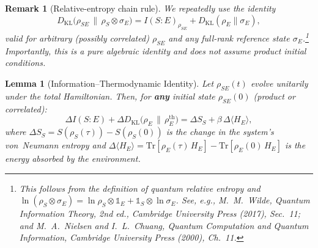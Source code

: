 \documentclass[12pt,a4paper,openany]{book}
\newtheorem{lemma}[theorem]{Lemma}
\newtheorem{remark}[theorem]{Remark}
\begin{document}
\begin{remark}[Relative-entropy chain rule]
\label{T-I-rem:chain_rule}
We repeatedly use the identity
\begin{equation}
\label{T-I-eq:chain_general}
D_{\mathrm{KL}}\!\bigl(\rho_{SE}\,\big\|\,
  \rho_S\otimes\sigma_E\bigr)
= I(S{:}E)_{\rho_{SE}}
  + D_{\mathrm{KL}}(\rho_E\|\sigma_E),
\end{equation}
valid for \emph{arbitrary} (possibly correlated)
$\rho_{SE}$ and any full-rank reference state
$\sigma_E$.\footnote{This follows from the definition of
quantum relative entropy and
$\ln(\rho_S\otimes\sigma_E)
= \ln\rho_S\otimes\mathbb{1}_E
  +\mathbb{1}_S\otimes\ln\sigma_E$.
See, e.g., M.~M.~Wilde, \emph{Quantum Information
Theory}, 2nd ed., Cambridge University Press (2017),
Sec.~11; and M.~A.~Nielsen and I.~L.~Chuang,
\emph{Quantum Computation and Quantum Information},
Cambridge University Press (2000), Ch.~11.}
Importantly, this is a \emph{pure algebraic identity} and
does not assume product initial conditions.
\end{remark}

\begin{lemma}[Information--Thermodynamic Identity]
\label{T-I-lem:info_thermo}
Let $\rho_{SE}(t)$ evolve unitarily under the total
Hamiltonian.
Then, for \textbf{any} initial state $\rho_{SE}(0)$
(product or correlated):
\begin{equation}
\label{T-I-eq:info_thermo}
\Delta I(S{:}E)
+ \Delta D_{\mathrm{KL}}\!\bigl(\rho_E \,\big\|\,
  \rho_E^{\mathrm{th}}\bigr)
= \Delta S_S + \beta\,\Delta\langle H_E \rangle,
\end{equation}
where $\Delta S_S = S(\rho_S(\tau)) - S(\rho_S(0))$ is the
change in the system's von~Neumann entropy and
$\Delta\langle H_E \rangle
= \mathrm{Tr}[\rho_E(\tau)\, H_E]
  - \mathrm{Tr}[\rho_E(0)\, H_E]$
is the energy absorbed by the environment.
\end{lemma}
\end{document}
